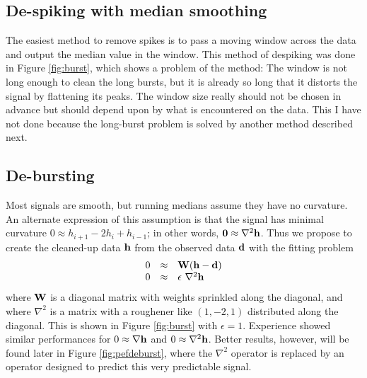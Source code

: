 \subsection{De-spiking with median smoothing}

The easiest method to remove spikes is to pass a moving window
across the data and output the median value in the window.
This method of despiking was done in Figure \ref{fig:burst},
which shows a problem of the method:
The window is not long enough to clean the long bursts,
but it is already so long
that it distorts the signal by flattening its peaks.
The window size really should not be chosen in advance
but should depend upon by what is encountered on the data.
This I have not done
because the long-burst problem is solved
by another method described next.

\subsection{De-bursting}
Most signals are smooth, but running medians assume they have no curvature.
An alternate expression of this assumption is that the signal
has minimal curvature
$ 0 \approx h_{i+1} -2 h_{i} + h_{i-1} $;
in other words,
$ \bold 0 \approx \nabla^2 \bold h$.
Thus we propose to create the cleaned-up data $\bold h$
from the observed data $\bold d$ with the fitting problem
\begin{equation}
  \begin{array}{lll}
        0 &\approx & \bold W  (\bold h - \bold d)                       \\
        0 &\approx & \epsilon\  \nabla^2   \bold h
  \end{array}
\end{equation}
where $\bold W$ is a diagonal matrix with weights sprinkled along the diagonal,
and where $\nabla^2$ is a matrix
with a roughener like $(1,-2,1)$ distributed along the diagonal.
This is shown in Figure \ref{fig:burst} with $\epsilon = 1$.
Experience showed similar performances
for $0 \approx \nabla \bold h$ and $0 \approx \nabla^2 \bold h$.
Better results, however, will be found later in Figure
\ref{fig:pefdeburst},
where the $\nabla^2$ operator is replaced
by an operator designed to predict this very predictable signal.


